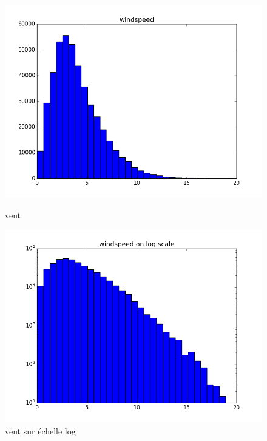 \begin{figure}[H]
	\captionsetup{labelformat=empty}
	\includegraphics[width=\linewidth]{images/vent.png}
	\caption{vent}
	\endminipage\hfill
	\includegraphics[width=\linewidth]{images/log_vent.png}
	\caption{vent sur échelle log}
	\endminipage\hfill
\end{figure}

